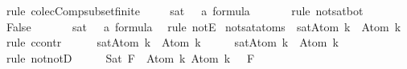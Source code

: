 \begin{isabellebody}
\ {\isacharparenleft}rule\ colecComp{\isacharunderscore}subset{\isacharunderscore}finite{\isacharparenright}\isanewline
\ \ \isamarkupfalse%
\ {\isachardoublequoteopen}{\isasymnot}\ sat\ {\isacharbraceleft}{\isasymbottom}\ {\isacharcolon}{\isacharcolon}\ {\isacharprime}a\ formula{\isacharbraceright}{\isachardoublequoteclose}\ \isanewline
\ \ \ \ \isamarkupfalse%
\ {\isacharparenleft}rule\ not{\isacharunderscore}sat{\isacharunderscore}bot{\isacharparenright}\isanewline
\ \ \isamarkupfalse%
\ \isamarkupfalse%
\ False\ \isanewline
\ \ \ \ \isamarkupfalse%
\ {\isacartoucheopen}sat\ {\isacharbraceleft}{\isasymbottom}\ {\isacharcolon}{\isacharcolon}\ {\isacharprime}a\ formula{\isacharbraceright}{\isacartoucheclose}\ \isamarkupfalse%
\ {\isacharparenleft}rule\ notE{\isacharparenright}\isanewline
{}\isamarkupfalse%
%
\endisatagproof
{\isafoldproof}%
%
\isadelimproof
\isanewline
%
\endisadelimproof
\isanewline
{}\isamarkupfalse%
\ not{\isacharunderscore}sat{\isacharunderscore}atoms{\isacharcolon}\ {\isachardoublequoteopen}{\isasymnot}\ sat{\isacharparenleft}{\isacharbraceleft}Atom\ k{\isacharcomma}\ \isactrlbold {\isasymnot}\ {\isacharparenleft}Atom\ k{\isacharparenright}{\isacharbraceright}{\isacharparenright}{\isachardoublequoteclose}\isanewline
%
\isadelimproof
%
\endisadelimproof
%
\isatagproof
{}\isamarkupfalse%
\ {\isacharparenleft}rule\ ccontr{\isacharparenright}\isanewline
\ \ \isamarkupfalse%
\ {\isachardoublequoteopen}{\isasymnot}\ {\isasymnot}\ sat{\isacharparenleft}{\isacharbraceleft}Atom\ k{\isacharcomma}\ \isactrlbold {\isasymnot}\ {\isacharparenleft}Atom\ k{\isacharparenright}{\isacharbraceright}{\isacharparenright}{\isachardoublequoteclose}\isanewline
\ \ \isamarkupfalse%
\ \isamarkupfalse%
\ {\isachardoublequoteopen}sat{\isacharparenleft}{\isacharbraceleft}Atom\ k{\isacharcomma}\ \isactrlbold {\isasymnot}\ {\isacharparenleft}Atom\ k{\isacharparenright}{\isacharbraceright}{\isacharparenright}{\isachardoublequoteclose}\isanewline
\ \ \ \ \isamarkupfalse%
\ {\isacharparenleft}rule\ notnotD{\isacharparenright}\isanewline
\ \ \isamarkupfalse%
\ \isamarkupfalse%
\ Sat{\isacharcolon}{\isachardoublequoteopen}{\isasymexists}{\isasymA}{\isachardot}\ {\isasymforall}F\ {\isasymin}\ {\isacharbraceleft}Atom\ k{\isacharcomma}\ \isactrlbold {\isasymnot}{\isacharparenleft}Atom\ k{\isacharparenright}{\isacharbraceright}{\isachardot}\ {\isasymA}\ {\isasymTurnstile}\ F{\isachardoublequoteclose}\isanewline

\end{isabellebody}

